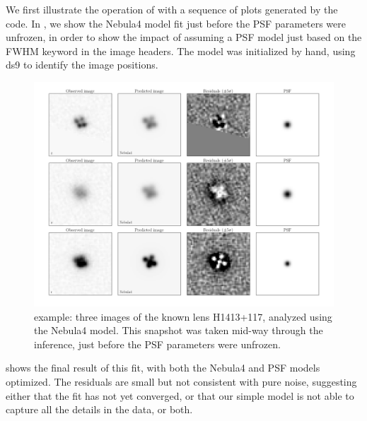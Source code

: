 \documentclass[useAMS,usenatbib]{mn2e}
\begin{document}
We first illustrate the operation of \LT with a sequence of plots generated
by the code. In , we show the Nebula4 model
fit just before the PSF parameters were unfrozen, in order to show the
impact of assuming a PSF model just based on the FWHM keyword in the image
headers. The model was initialized by hand, using ds9 to identify the image
positions.

\begin{figure}
\centerline{
\includegraphics[width=0.9\linewidth]{figs/H1413+117_10x10arcsec_progress-06_optimizing_Nebula4.png}}
\caption{\LT example: three images of the known lens H1413+117, analyzed using
the Nebula4 model. This snapshot was taken mid-way through the inference, just
before the PSF parameters were unfrozen.}
\label{fig:H1413example-progress}
\end{figure}

 shows the final result of this fit, with both
the Nebula4 and PSF models optimized. The residuals are small but not
consistent with pure noise, suggesting either that the fit has not yet
converged, or that our simple model is not able to capture all the details
in the data, or both.

\end{document}
